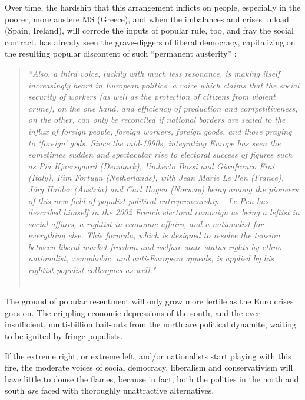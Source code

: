 \documentclass[11pt,a4paper,oneside]{article}
\begin{document}
Over time, the hardship that this arrangement inflicts on people, especially in the poorer, more austere \gls{MS} (Greece), and when the imbalances and crises unload (Spain, Ireland), will corrode the inputs of popular rule, too, and fray the social contract.
\citeauthor{Offe2003} has already seen the grave-diggers of liberal democracy, capitalizing on the resulting popular discontent of such ``permanent austerity'' \citep{Streeck2010b}:
\begin{quote}
	\emph{``Also, a third voice, luckily with much less resonance, is making itself increasingly heard in European politics, a voice which claims that the social security of workers (as well as the protection of citizens from violent crime), on the one hand, and efficiency of production and competitiveness, on the other, can only be reconciled if national borders are sealed to the influx of foreign people, foreign workers, foreign goods, and those praying to `foreign' gods.
	Since the mid-1990s, integrating Europe has seen the sometimes sudden and spectacular rise to electoral success of figures such as Pia Kjaersgaard (Denmark), Umberto Bossi and Gianfranco Fini (Italy), Pim Fortuyn (Netherlands), with Jean Marie Le Pen (France), J\"{o}rg Haider (Austria) and Carl Hagen (Norway) being among the pioneers of this new field of populist political entrepreneurship.~
	Le Pen has described himself in the 2002 French electoral campaign as being a leftist in social affairs, a rightist in economic affairs, and a nationalist for everything else.
	This formula, which is designed to resolve the tension between liberal market freedom and welfare state status rights by ethno-nationalist, xenophobic, and anti-European appeals, is applied by his rightist populist colleagues as well."}\\
	--- \citep[454]{Offe2003}
\end{quote}

The ground of popular resentment will only grow more fertile as the Euro crises goes on.
The crippling economic depressions of the south, and the ever-insufficient, multi-billion bail-outs from the north are political dynamite, waiting to be ignited by fringe populists.


If the extreme right, or extreme left, and/or nationalists start playing with this fire, the moderate voices of social democracy, liberalism and conservativism will have little to douse the flames, because in fact, both the polities in the north and south \emph{are} faced with thoroughly unattractive alternatives.
\end{document}
